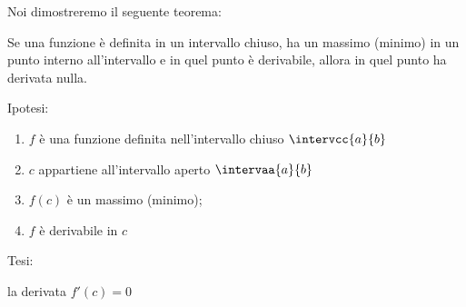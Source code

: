 Noi dimostreremo il seguente teorema:
\begin{teorema}
Se una funzione è  
definita in un intervallo chiuso, 
ha un massimo (minimo) in un punto interno all'intervallo
e in quel punto è derivabile, 
allora in quel punto ha derivata nulla.
\end{teorema}

\noindent Ipotesi:
\begin{enumerate}[nosep]
 \item \(f\) è una funzione definita nell'intervallo chiuso \(\intervcc{a}{b}\)
 \item \(c\) appartiene all'intervallo aperto \(\intervaa{a}{b}\)
 \item \(f(c)\) è un massimo (minimo);
 \item \(f\) è derivabile in \(c\)
\end{enumerate}

\noindent Tesi: 

la derivata \(f'(c)=0\)
 
 
